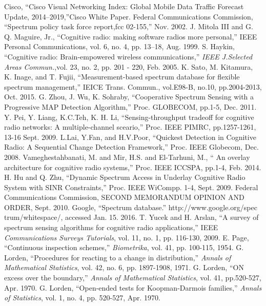 \documentclass[technicalreport]{ieicej}
\begin{document}

%
 \begin{thebibliography}{10}
Cisco, ``Cisco Visual Networking Index: Global Mobile Data Traffic Forecast Update, 2014–2019,''Cisco White Paper.
Federal Communications Commission, ``Spectrum policy task force report,fcc 02-155,'' Nov. 2002.
J. Mitola III and G. Q. Maguire, Jr., ``Cognitive radio: making software radios more personal,'' IEEE Personal Communications, vol. 6, no. 4, pp. 13–18, Aug. 1999.
 S. Haykin, ``Cognitive radio: Brain-empowered wireless communications,'' {\it IEEE J.Selected Areas Commun.},vol. 23, no. 2, pp. 201 - 220, Feb. 2005.
 K. Sato, M. Kitamura, K. Inage, and T. Fujii, ``Measurement-based spectrum database for flexible spectrum management,'' IEICE Trans. Commun., vol.E98-B, no.10, pp.2004-2013, Oct. 2015.
G. Zhou, J. Wu, K. Sohraby, ``Cooperative Spectrum Sensing with a Progressive MAP Detection Algorithm,'' Proc. GLOBECOM, pp.1-5, Dec. 2011.
Y. Pei, Y. Liang, K.C.Teh, K. H. Li, ``Sensing-throughput tradeoff for cognitive radio networks: A multiple-channel sceario,'' Proc. IEEE PIMRC, pp.1257-1261, 13-16 Sept. 2009.
L.Lai, Y.Fan, and H.V.Poor, ``Quickest Detection in Cognitive Radio: A Sequential Change Detection Framework,'' Proc. IEEE Globecom, Dec. 2008.
Vameghestahbanati, M. and Mir, H.S. and El-Tarhuni, M., `` An overlay architecture for cognitive radio systems,'' Proc. IEEE ICCSPA, pp.1-4, Feb. 2014.
H. Hu and Q. Zhu, ``Dynamic Spectrum Access in Underlay Cognitive Radio System with SINR Constraints,'' Proc. IEEE WiCompp. 1-4, Sept. 2009.
Federal Communications Commission, SECOND MEMORANDUM OPINION AND ORDER, Sept. 2010.
Google, ``Spectrum database.'' http://www.google.org/spec\\trum/whitespace/, accessed Jan. 15. 2016.
T. Yucek and H. Arslan, ``A survey of spectrum sensing algorithms for cognitive radio applications,'' IEEE {\it Communications Surveys Tutorials}, vol. 11, no. 1, pp. 116-130, 2009.
E. Page, ``Continuous inspection schemes,'' {\it Biometrika}, vol. 41, pp. 100-115, 1954.
G. Lorden, ``Procedures for reacting to a change in distribution,'' {\it Annals of Mathematical Statistics}, vol. 42, no. 6, pp. 1897-1908, 1971.  
G. Lorden, ``ON excess over the boundary,'' {\it Annals of Mathematical Statistics}, vol. 41, pp.520-527, Apr. 1970.
G. Lorden, ``Open-ended tests for Koopman-Darmois families,'' {\it Annals of Statistics}, vol. 1, no. 4, pp. 520-527, Apr. 1970.
 \end{thebibliography}
 
\end{document}
